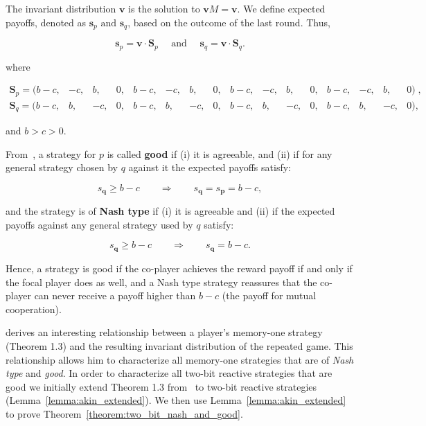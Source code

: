 \documentclass{article}
\theoremstyle{definition}
\begin{document}
The invariant distribution \(\mathbf{v}\) is the solution to
\(\mathbf{v} M = \mathbf{v}\). We define expected payoffs,
denoted as \(\mathbf{s}_{p} \text{ and } \mathbf{s}_{q}\),
based on the outcome of the last round. Thus,

\begin{equation*}
    \mathbf{s}_{p} = \mathbf{v} \cdot \mathbf{S}_{p} \quad \text{ and } \quad \mathbf{s}_{q} = \mathbf{v} \cdot \mathbf{S}_{q}.
\end{equation*}

where

\begin{equation}\label{eq:last_round_two_bits}
  \begin{array}{*{16}{c}}
    \mathbf{S}_{p} = ( b\!-\!c , & -c , & b , & 0 , & b\!-\!c , & -c , & b , & 0 , & b\!-\!c , & -c , & b , & 0 , & b\!-\!c , & -c , & b , & 0)  \;, \\
    \mathbf{S}_{q} = ( b\!-\!c, & b, & -c, & 0, & b\!-\!c, & b, & -c, & 0, & b\!-\!c, & b, & -c, & 0, & b\!-\!c, & b, & -c, & 0),
  \end{array}
\end{equation}

and \(b > c > 0\).

From~\citep{akin:EGADS:2016}, a strategy for \(p\) is called \textbf{good} if
(i) it is agreeable, and (ii) if for any general strategy chosen by \(q\)
against it the expected payoffs satisfy:

\begin{equation}
    s_{\mathbf{q}} \geq b\!-\!c \qquad \Rightarrow \qquad s_{\mathbf{q}} = s_{\mathbf{p}} =  b\!-\!c,
\end{equation}

and the strategy is of \textbf{Nash type} if (i) it is agreeable and (ii)
if the expected payoffs against any general strategy used by \(q\) satisfy:

\begin{equation}
    s_{\mathbf{q}} \geq b\!-\!c \qquad \Rightarrow \qquad s_{\mathbf{q}} =  b\!-\!c.
\end{equation}

Hence, a strategy is good if the co-player achieves the reward payoff if and
only if the focal player does as well, and a Nash type strategy reassures that
the co-player can never receive a payoff higher than \(b\!-\!c\) (the payoff for
mutual cooperation).

\citep{akin:EGADS:2016} derives an interesting relationship between a player's
memory-one strategy (Theorem 1.3) and the resulting invariant distribution of the repeated
game. This relationship allows him to characterize all memory-one strategies
that are of \textit{Nash type} and \textit{good}. In order to characterize all two-bit reactive strategies that are good we
initially extend Theorem 1.3 from~\citep{akin:EGADS:2016} to two-bit reactive
strategies (Lemma~\ref{lemma:akin_extended}). 
We then use Lemma~\ref{lemma:akin_extended} to prove
Theorem~\ref{theorem:two_bit_nash_and_good}.
\end{document}
